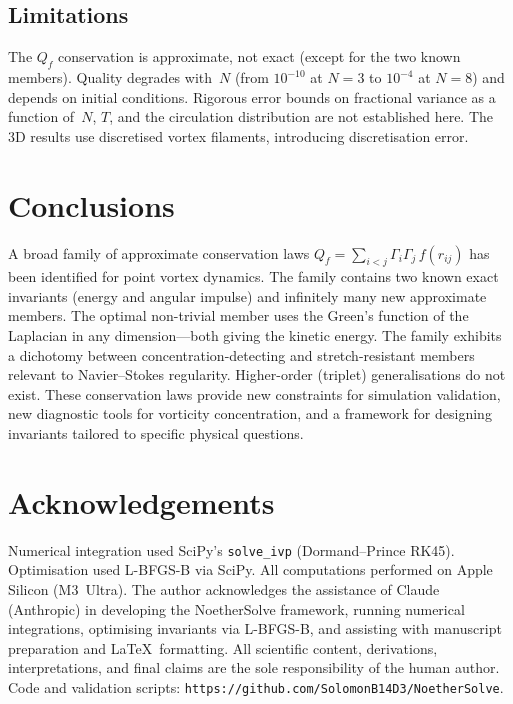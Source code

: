 \documentclass[rapids]{jfm}
\begin{document}
\subsection{Limitations}

The $Q_f$ conservation is approximate, not exact (except for the two known members). Quality degrades with~$N$ (from $10^{-10}$ at $N\!=\!3$ to $10^{-4}$ at $N\!=\!8$) and depends on initial conditions. Rigorous error bounds on fractional variance as a function of~$N$, $T$, and the circulation distribution are not established here. The 3D results use discretised vortex filaments, introducing discretisation error.

\section{Conclusions}

A broad family of approximate conservation laws $Q_f = \sum_{i<j} \Gamma_i \Gamma_j\, f(r_{ij})$ has been identified for point vortex dynamics. The family contains two known exact invariants (energy and angular impulse) and infinitely many new approximate members. The optimal non-trivial member uses the Green's function of the Laplacian in any dimension---both giving the kinetic energy. The family exhibits a dichotomy between concentration-detecting and stretch-resistant members relevant to Navier--Stokes regularity. Higher-order (triplet) generalisations do not exist. These conservation laws provide new constraints for simulation validation, new diagnostic tools for vorticity concentration, and a framework for designing invariants tailored to specific physical questions.

\section*{Acknowledgements}

Numerical integration used SciPy's \texttt{solve\_ivp} (Dormand--Prince RK45). Optimisation used L-BFGS-B via SciPy. All computations performed on Apple Silicon (M3~Ultra). The author acknowledges the assistance of Claude (Anthropic) in developing the NoetherSolve framework, running numerical integrations, optimising invariants via L-BFGS-B, and assisting with manuscript preparation and \LaTeX\ formatting. All scientific content, derivations, interpretations, and final claims are the sole responsibility of the human author. Code and validation scripts: \texttt{https://github.com/SolomonB14D3/NoetherSolve}.
\end{document}

